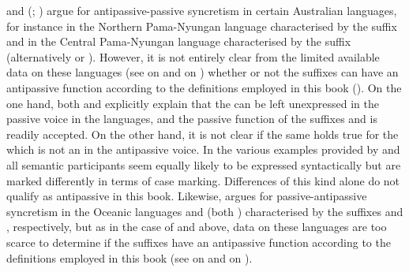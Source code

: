 \cite[151f.]{dixon:1994} and \citeauthor{dixon:aikhenvald:2000} (\citeyear[11]{dixon:aikhenvald:2000}; \citeyear[51]{dixon:aikhenvald:2011}) argue for antipas\-sive-passive syncretism in certain Australian languages, for instance in the Northern Pama-Nyungan language  characterised by the suffix  and in the Central Pama-Nyungan language  characterised by the suffix  (alternatively  or ). However, it is not entirely clear from the limited available data on these languages (see \citealt{patz:2002} on  and \citealt{austin:2013} on ) whether or not the suffixes can have an antipassive function according to the definitions employed in this book (). On the one hand, both \cite[148]{patz:2002} and \cite[162]{austin:2013} explicitly explain that the  can be left unexpressed in the passive voice in the languages, and the passive function of the suffixes  and  is readily accepted. On the other hand, it is not clear if the same holds true for the  which is not an  in the antipassive voice. In the various examples provided by  \cite[151]{patz:2002} and \cite[160]{austin:2013} all semantic participants seem equally likely to be expressed syntactically but are marked differently in terms of  case marking. Differences of this kind alone do not qualify as antipassive in this book. Likewise, \cite{janic:2016} argues for passive-antipassive syncretism in the Oceanic languages  and  (both ) characterised by the suffixes  and , respectively, but as in the case of  and  above, data on these languages are too scarce to determine if the suffixes have an antipassive function according to the definitions employed in this book (see \citealt{harrison:1976} on  and \citealt{schlie:1983} on ). 

